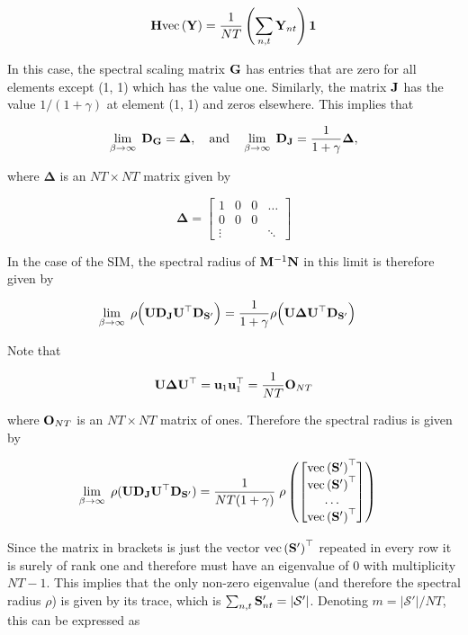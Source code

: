 $$
\mathbf{H} \text{\textup{vec}}\left(\mathbf{Y}\right) = \frac{1}{NT} \left(\sum_{n, t} \mathbf{Y}_{nt}\right) \mathbf{1}
$$


In this case, the spectral scaling matrix $\mathbf{G}$ has entries that are zero for all elements except (1, 1) which has the value one. Similarly, the matrix $\mathbf{J}$ has the value $1 / (1 + \gamma)$ at element (1, 1) and zeros elsewhere. This implies that


$$
\lim_{\beta \rightarrow \infty} \; \mathbf{D}_{\mathbf{G}} = \mathbf{\Delta}, \quad \text{and} \quad \lim_{\beta \rightarrow \infty} \; \mathbf{D}_{\mathbf{J}} = \frac{1}{1 + \gamma} \mathbf{\Delta}, 
$$

where $\mathbf{\Delta}$ is an $NT \times NT$ matrix given by

$$
\mathbf{\Delta} = \begin{bmatrix}
    1 & 0 & 0 & \dots \\
    0 & 0 & 0 &  \\
    \vdots & & & \ddots
\end{bmatrix}
$$

 In the case of the SIM, the spectral radius of $\mathbf{M}^{-1}\mathbf{N}$ in this limit is therefore given by

\begin{align*}
    \lim_{\beta \rightarrow \infty} \; \rho\Big(\mathbf{U} \mathbf{D}_{\mathbf{J}} \mathbf{U}^\top \mathbf{D}_{\mathbf{S}'} \Big) &= \frac{1}{1 + \gamma} \rho\Big(\mathbf{U} \mathbf{\Delta} \mathbf{U}^\top \mathbf{D}_{\mathbf{S}'} \Big)
\end{align*}

Note that 

\begin{equation*}
    \mathbf{U} \mathbf{\Delta} \mathbf{U}^\top = \mathbf{u}_1 \mathbf{u}_1^\top  = \frac{1}{NT} \mathbf{O}_{NT}
\end{equation*}

where $ \mathbf{O}_{NT}$ is an $NT \times NT$ matrix of ones. Therefore the spectral radius is given by 

\begin{align*}
    \lim_{\beta \rightarrow \infty} \; \rho(\mathbf{U} \mathbf{D}_{\mathbf{J}} \mathbf{U}^\top \mathbf{D}_{\mathbf{S}'}) &= \frac{1}{NT (1 + \gamma) } \; \rho \left( \begin{bmatrix}
        \text{\textup{vec}}\left(\mathbf{S}'\right)^\top \\ \text{\textup{vec}}\left(\mathbf{S}'\right)^\top \\ \dots \\ \text{\textup{vec}}\left(\mathbf{S}'\right)^\top
    \end{bmatrix} \right)
\end{align*}

Since the matrix in brackets is just the vector $\text{\textup{vec}}\left(\mathbf{S}'\right)^\top$ repeated in every row it is surely of rank one and therefore must have an eigenvalue of 0 with multiplicity $NT - 1$. This implies that the only non-zero eigenvalue (and therefore the spectral radius $\rho$) is given by its trace, which is $\sum_{n, t}\mathbf{S}'_{nt} = |\mathcal{S}'|$. Denoting  $m=|\mathcal{S}'|/NT$, this can be expressed as 

